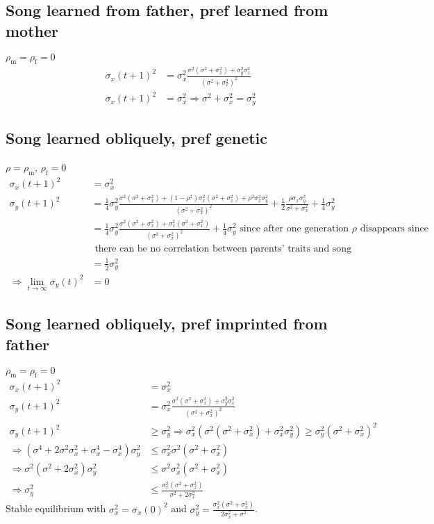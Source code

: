 \documentclass{article}
\newcommand{\x}[1]{\text{#1}}
\begin{document}
\subsection{Song learned from father, pref learned from mother }
$\rho_\x{m}=\rho_\x{f}=0$
\begin{align*}
\sigma_x(t+1)^2&=\sigma_x^2\frac{\sigma^2(\sigma^2+\sigma_x^2)+\sigma_y^2\sigma_x^2}{(\sigma^2+\sigma_x^2)^2}
\\ \sigma_x(t+1)^2&=\sigma_x^2 \Rightarrow \sigma^2+\sigma_x^2=\sigma_y^2
\end{align*}
\subsection{Song learned obliquely, pref genetic }
$\rho=\rho_\x{m}$, $\rho_\x{f}=0$
\begin{align*}
\sigma_x(t+1)^2&=\sigma_x^2
\\ \sigma_y(t+1)^2&=\frac{1}{4}\sigma_y^2\frac{\sigma^2(\sigma^2+\sigma_x^2)+(1-\rho^2)\sigma_x^2(\sigma^2+\sigma_x^2)+\rho^2\sigma_x^2\sigma_y^2}{(\sigma^2+\sigma_x^2)^2}+\frac{1}{2}\frac{\rho\sigma_x\sigma_y^3}{\sigma^2+\sigma_x^2}+\frac{1}{4}\sigma_y^2 
\\&=\frac{1}{4}\sigma_y^2\frac{\sigma^2(\sigma^2+\sigma_x^2)+\sigma_x^2(\sigma^2+\sigma_x^2)}{(\sigma^2+\sigma_x^2)^2}+\frac{1}{4}\sigma_y^2  \text{ since after one generation $\rho$ disappears since}
\\ & \text{ there can be no correlation between parents' traits and song model}
\\&=\frac{1}{2}\sigma_y^2
\\ \Rightarrow \lim_{t\to\infty}\sigma_y(t)^2&=0
\end{align*}
\subsection{Song learned obliquely, pref imprinted from father }
$\rho_\x{m}=\rho_\x{f}=0$
\begin{align*}
\sigma_x(t+1)^2&=\sigma_x^2
\\ \sigma_y(t+1)^2&= \sigma_x^2\frac{\sigma^2(\sigma^2+\sigma_x^2)+\sigma_y^2\sigma_x^2}{(\sigma^2+\sigma_x^2)^2}
\\ \sigma_y(t+1)^2&\geq\sigma_y^2 \Rightarrow \sigma_x^2(\sigma^2(\sigma^2+\sigma_x^2)+\sigma_x^2\sigma_y^2)\geq\sigma_y^2(\sigma^2+\sigma_x^2)^2
\\ \Rightarrow \left(\sigma^4+2\sigma^2\sigma_x^2+\sigma_x^4-\sigma_x^4\right)\sigma_y^2&\leq\sigma_x^2\sigma^2(\sigma^2+\sigma_x^2)
\\ \Rightarrow \sigma^2(\sigma^2+2\sigma_x^2)\sigma_y^2&\leq\sigma^2\sigma_x^2(\sigma^2+\sigma_x^2)
\\ \Rightarrow \sigma_y^2&\leq\frac{\sigma_x^2(\sigma^2+\sigma_x^2)}{\sigma^2+2\sigma_x^2} 
\end{align*}
Stable equilibrium with $\sigma_x^2=\sigma_x(0)^2$ and $\sigma_y^2=\frac{\sigma_x^2(\sigma^2+\sigma_x^2)}{2\sigma_x^2+\sigma^2}$.
\end{document}
